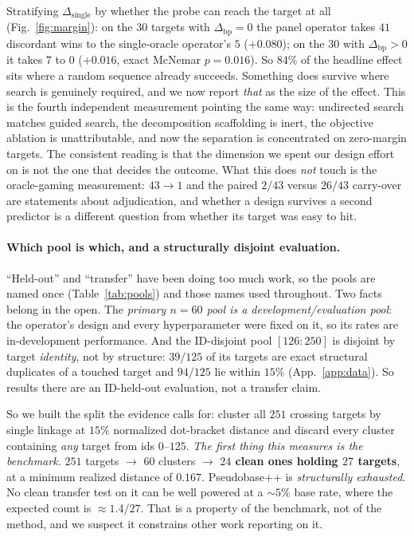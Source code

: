 \documentclass[11pt]{article}
\begin{document}
Stratifying $\Delta_{\mathrm{single}}$ by whether the probe can reach the target at all (Fig.~\ref{fig:margin}): on the $30$ targets
with $\Delta_{\mathrm{bp}}=0$ the panel operator takes $41$ discordant wins to the single-oracle operator's $5$
(${+}0.080$); on the $30$ with $\Delta_{\mathrm{bp}}>0$ it takes $7$ to $0$ (${+}0.016$, exact McNemar
$p{=}0.016$). So $84\%$ of the headline effect sits where a random sequence already succeeds. Something does
survive where search is genuinely required, and we now report \emph{that} as the size of the effect. This is
the fourth independent measurement pointing the same way: undirected search matches guided search, the
decomposition scaffolding is inert, the objective ablation is unattributable, and now the separation is
concentrated on zero-margin targets. The consistent reading is that the dimension we spent our design effort
on is not the one that decides the outcome. What this does \emph{not} touch is the oracle-gaming measurement:
$43\!\to\!1$ and the paired $2/43$ versus $26/43$ carry-over are statements about adjudication, and whether a
design survives a second predictor is a different question from whether its target was easy to hit.

\paragraph{Which pool is which, and a structurally disjoint evaluation.} ``Held-out'' and ``transfer'' have
been doing too much work, so the pools are named once (Table~\ref{tab:pools}) and those names used throughout.
Two facts belong in the open. The \emph{primary $n{=}60$ pool is a development/evaluation pool}: the
operator's design and every hyperparameter were fixed on it, so its rates are in-development performance. And
the ID-disjoint pool $[126{:}250]$ is disjoint by target \emph{identity}, not by structure: $39/125$ of its
targets are exact structural duplicates of a touched target and $94/125$ lie within $15\%$
(App.~\ref{app:data}). So results there are an ID-held-out evaluation, not a transfer claim.

So we built the split the evidence calls for: cluster all $251$ crossing targets by single linkage at $15\%$
normalized dot-bracket distance and discard every cluster containing \emph{any} target from ids $0$--$125$.
\emph{The first thing this measures is the benchmark.} $251$ targets $\to$ $60$ clusters $\to$ \textbf{$24$ clean ones holding $27$ targets}, at a minimum realized
distance of $0.167$. Pseudobase++ is \emph{structurally exhausted}. No clean transfer test on it can be well
powered at a $\sim\!5\%$ base rate, where the expected count is $\approx\!1.4/27$. That is a property of the benchmark, not of the method, and we suspect it
constrains other work reporting on it.
\end{document}
